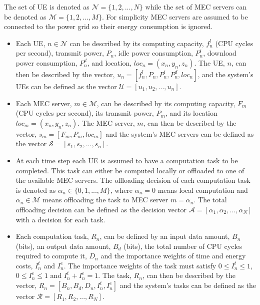 The set of \acrshort{UE} is denoted as $\mathcal{N} = \{1, 2, ..., N\}$ while the set of \acrshort{MEC} servers can be denoted as $\mathcal{M} = \{1, 2, ..., M\}$. For simplicity \acrshort{MEC} servers are assumed to be connected to the power grid so their energy consumption is ignored.
\begin{itemize}
    \item Each \acrshort{UE}, $n \in \mathcal{N}$ can be described by its computing capacity, $f_n^l$ (\acrshort{CPU} cycles per second), transmit power, $P_n$, idle power consumption, $P^i_n$, download power consumption, $P_n^d$, and location, $loc_n = (x_n, y_n, z_n)$. The UE, $n$, can then be described by the vector, $u_n = [f_n^l, P_n, P_n^i, P_n^d, loc_n]$, and the system's \acrshort{UE}s can be defined as the vector $\mathcal{U} = [u_1, u_2, ..., u_n]$.

    \item Each \acrshort{MEC} server, $m \in \mathcal{M}$, can be described by its computing capacity, $F_m$ (\acrshort{CPU} cycles per second), its transmit power, $P_m$, and its location $loc_m = (x_n, y_n, z_n)$. The \acrshort{MEC} server, $m$, can then be described by the vector, $s_m = [F_m, P_m, loc_m]$ and the system's \acrshort{MEC} servers can be defined as the vector $\mathcal{S} = [s_1, s_2, ..., s_n]$.

    \item At each time step each \acrshort{UE} is assumed to have a computation task to be completed. This task can either be computed locally or offloaded to one of the available \acrshort{MEC} servers. The offloading decision of each computation task is denoted as $\alpha_n \in \{0, 1, ..., M\}$, where $\alpha_n = 0$ means local computation and $\alpha_n \in \mathcal{M}$ means offloading the task to \acrshort{MEC} server $m = \alpha_n$. The total offloading decision can be defined as the decision vector $\mathcal{A} = [\alpha_1, \alpha_2, ..., \alpha_N]$ with a decision for each task.

    \item Each computation task, $R_n$, can be defined by an input data amount, $B_n$ (bits), an output data amount, $B_d$ (bits), the total number of \acrshort{CPU} cycles required to compute it, $D_n$ and the importance weights of time and energy costs, $I_n^t$ and $I_n^e$. The importance weights of the task must satisfy $0 \leq I_n^t \leq 1$, $0 \leq I_n^e \leq 1$ and $I_n^t + I_n^e = 1$. The task, $R_n$, can then be described by the vector, $R_n = [B_n, B_d, D_n, I_n^t, I_n^e]$ and the system's tasks can be defined as the vector $\mathcal{R} = [R_1, R_2, ..., R_N]$.


\end{itemize}

